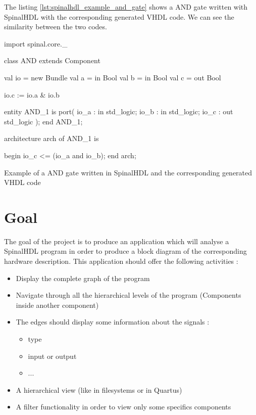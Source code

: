 The listing \ref{lst:spinalhdl_example_and_gate} shows a AND gate written with
SpinalHDL with the corresponding generated VHDL code. We can see the
similarity between the two codes.

\begin{listing}[H] %
    \centering

    \begin{minipage}[c]{0.45\textwidth}
    \begin{scalacode}
    import spinal.core._

    class AND extends Component
    {
        val io = new Bundle
        {
            val a = in Bool
            val b = in Bool
            val c = out Bool
        }

        io.c := io.a & io.b
    }
    \end{scalacode}
    \end{minipage}
    \hfill
    \begin{minipage}[c]{0.45\textwidth}
    \begin{vhdlcode}
    entity AND_1 is
        port(
            io_a : in std_logic;
            io_b : in std_logic;
            io_c : out std_logic
        );
    end AND_1;

    architecture arch of AND_1 is

    begin
      io_c <= (io_a and io_b);
    end arch;
    \end{vhdlcode}
    \end{minipage}
    \caption[SpinalHDL example and generated VHDL code]{Example of a AND gate written in SpinalHDL and the corresponding
             generated VHDL code}
    \label{lst:spinalhdl_example_and_gate}
\end{listing}

\section{Goal}
\label{sec:Goal}

The goal of the project is to produce an application which will analyse a
SpinalHDL program in order to produce a block diagram of the corresponding
hardware description. This application should offer the following activities :

\begin{itemize}
    \item Display the complete graph of the program
    \item Navigate through all the hierarchical levels of the program (Components
      inside another component)
    \item The edges should display some information about the signals :
    \begin{itemize}
        \item type
        \item input or output
        \item ...
    \end{itemize}
    \item A hierarchical view (like in filesystems or in Quartus)
    \item A filter functionality in order to view only some specifics components
\end{itemize}

